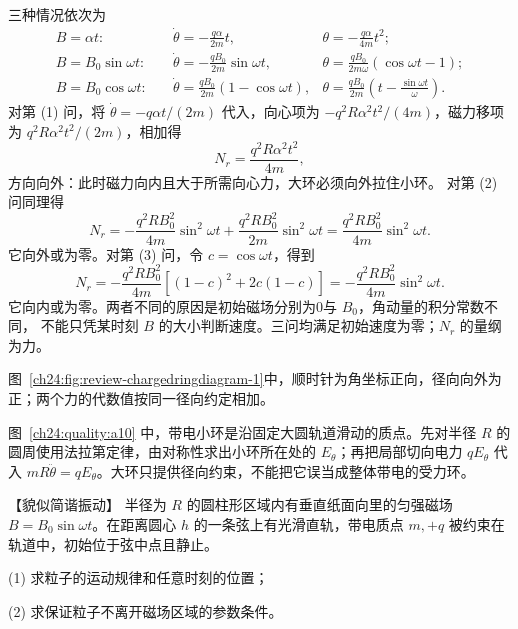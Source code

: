 {\begin{xesolution}
三种情况依次为
\begin{align}
  B=\alpha t:\quad
  &\boxed{\dot\theta=-\frac{q\alpha}{2m}t},
  &\boxed{\theta=-\frac{q\alpha}{4m}t^2};\\
  B=B_0\sin\omega t:\quad
  &\boxed{\dot\theta=-\frac{qB_0}{2m}\sin\omega t},
  &\boxed{\theta=\frac{qB_0}{2m\omega}(\cos\omega t-1)};\\
  B=B_0\cos\omega t:\quad
  &\boxed{\dot\theta=\frac{qB_0}{2m}(1-\cos\omega t)},
  &\boxed{\theta=\frac{qB_0}{2m}\left(t-\frac{\sin\omega t}{\omega}\right)}.
\end{align}
对第 (1) 问，将 $\dot\theta=-q\alpha t/(2m)$ 代入，向心项为
$-q^2R\alpha^2t^2/(4m)$，磁力移项为 $q^2R\alpha^2t^2/(2m)$，相加得
\begin{equation}
  \boxed{N_r=\frac{q^2R\alpha^2t^2}{4m}},
\end{equation}
方向向外：此时磁力向内且大于所需向心力，大环必须向外拉住小环。
对第 (2) 问同理得
\[
 N_r=-\frac{q^2RB_0^2}{4m}\sin^2\omega t
      +\frac{q^2RB_0^2}{2m}\sin^2\omega t
 =\boxed{\frac{q^2RB_0^2}{4m}\sin^2\omega t}.
\]
它向外或为零。对第 (3) 问，令 $c=\cos\omega t$，得到
\[
 N_r=-\frac{q^2RB_0^2}{4m}[(1-c)^2+2c(1-c)]
 =\boxed{-\frac{q^2RB_0^2}{4m}\sin^2\omega t}.
\]
它向内或为零。两者不同的原因是初始磁场分别为0与 $B_0$，角动量的积分常数不同，
不能只凭某时刻 $B$ 的大小判断速度。三问均满足初始速度为零；$N_r$ 的量纲为力。

图~\ref{ch24:fig:review-chargedringdiagram-1}中，顺时针为角坐标正向，径向向外为正；两个力的代数值按同一径向约定相加。


图~\ref{ch24:quality:a10} 中，带电小环是沿固定大圆轨道滑动的质点。先对半径 $R$ 的圆周使用法拉第定律，由对称性求出小环所在处的 $E_\theta$；再把局部切向电力 $qE_\theta$ 代入 $mR\ddot\theta=qE_\theta$。大环只提供径向约束，不能把它误当成整体带电的受力环。
\end{xesolution}



\begin{origexamplebox}{【貌似简谐振动】}\label{ch24:ex:s40-9-11}
半径为 $R$ 的圆柱形区域内有垂直纸面向里的匀强磁场
$B=B_0\sin\omega t$。在距离圆心 $h$ 的一条弦上有光滑直轨，带电质点 $m,+q$ 被约束在轨道中，初始位于弦中点且静止。

(1) 求粒子的运动规律和任意时刻的位置；

(2) 求保证粒子不离开磁场区域的参数条件。


\end{origexamplebox}}
